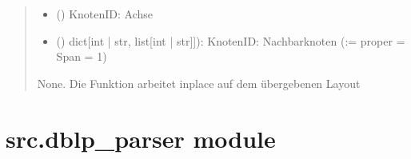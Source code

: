 \documentclass[a4paper,10pt,ngerman]{sphinxmanual}
\begin{document}
\begin{fulllineitems}
\begin{quote}
\begin{description}
\begin{itemize}
\item {} 
\sphinxAtStartPar
{} () \textendash{} Knoten\sphinxhyphen{}ID: Achse

\item {} 
\sphinxAtStartPar
\sphinxstyleliteralstrong{\sphinxupquote{(}} () \textendash{} dict{[}int | str, list{[}int | str{]}{]}): Knoten\sphinxhyphen{}ID: Nachbarknoten (:= proper = Span = 1)

\end{itemize}

\sphinxAtStartPar
{}

\sphinxAtStartPar
None. Die Funktion arbeitet in\sphinxhyphen{}place auf dem übergebenen Layout

\end{description}\end{quote}

\end{fulllineitems}



\section{src.dblp\_parser module}
\label{\detokenize{api:module-src.dblp_parser}}\label{\detokenize{api:src-dblp-parser-module}}
\end{document}
